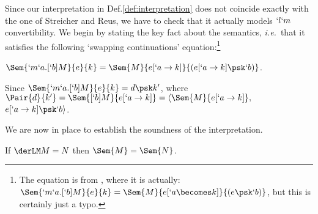 \documentclass{lmcs}
\def\ie{\emph{i.e.}}
\begin{document}
Since our interpretation in Def.\skp\ref{def:interpretation} does not coincide exactly with the one of Streicher and Reus, we have to check that it actually models $`l`m$ convertibility.
We begin by stating the key fact about the semantics, \ie~that it satisfies the following `swapping continuations' equation:\footnote{The equation is from \cite{Streicher-Reus'98}, where it is actually:
$ \Sem{ `m`a.[`b]M }{ e }{ k } = \Sem{ M }{ e[`a \becomes k] }{ (e\psk `b)}$, but this is certainly just a typo.}

 \begin{lem} \label{lem:sem-shortcut}
$ \Sem{ `m`a.[`b]M }{ e }{ k } = \Sem{ M }{ e[`a \to k] }{ (e[`a \to k] \psk `b) }$.
 \end{lem}

 \begin{Proof}
Since $\Sem{ `m`a.[`b]M }{ e }{ k } = d\psk k'$, where
$ \Pair{ d }{ k' } = \Sem{ [`b]M}{ e[`a\to k] } = \langle \Sem{ M }{ e[`a\to k] } ,$ \\ $ e[`a\to k]\psk `b \rangle $. %
 \end{Proof}

We are now in place to establish the soundness of the interpretation.

 \begin{thm} \label{thm:sem_soundness}
If $ \derLM M = N $ then $ \Sem{ M } = \Sem{ N } $.
 \end{thm}
\end{document}
